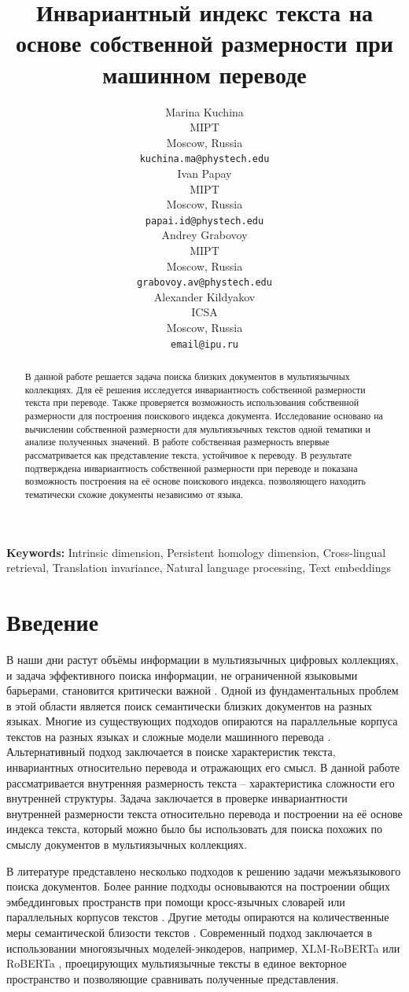 \documentclass{article}
\title{Инвариантный индекс текста на основе собственной размерности при машинном переводе}
\author{
  Marina Kuchina\\
  MIPT\\
  Moscow, Russia\\
  \texttt{kuchina.ma@phystech.edu}\\
  \And
  Ivan Papay\\
  MIPT\\
  Moscow, Russia\\
  \texttt{papai.id@phystech.edu}\\
  \AND
  Andrey Grabovoy\\
  MIPT\\
  Moscow, Russia\\
  \texttt{grabovoy.av@phystech.edu}\\
  \And
  Alexander Kildyakov\\
  ICSA\\
  Moscow, Russia\\
  \texttt{email@ipu.ru}\\
}
\begin{document}
\maketitle

\begin{abstract}
  В данной работе решается задача поиска близких документов в мультиязычных коллекциях. Для её решения исследуется инвариантность собственной размерности текста при переводе. Также проверяется возможность использования собственной размерности для построения поискового индекса документа. Исследование основано на вычислении собственной размерности для мультиязычных текстов одной тематики и анализе полученных значений. В работе собственная размерность впервые рассматривается как представление текста, устойчивое к переводу. В результате подтверждена инвариантность собственной размерности при переводе и показана возможность построения на её основе поискового индекса, позволяющего находить тематически схожие документы независимо от языка.
\end{abstract}

\textbf{Keywords:} Intrinsic dimension, Persistent homology dimension, Cross-lingual retrieval, Translation invariance, Natural language processing, Text embeddings

\section{Введение}\label{sec:intro}

В наши дни растут объёмы информации в мультиязычных цифровых коллекциях, и задача эффективного поиска информации, не ограниченной языковыми барьерами, становится критически важной \cite{bakhteev2019crosslang}. Одной из фундаментальных проблем в этой области является поиск семантически близких \cite{panchenko2018russeworkshoprussiansemantic} документов на разных языках. Многие из существующих подходов опираются на параллельные корпуса текстов на разных языках и сложные модели машинного перевода \cite{Avetisyan2023}. Альтернативный подход заключается в поиске характеристик текста, инвариантных относительно перевода и отражающих его смысл. В данной работе рассматривается внутренняя размерность текста – характеристика сложности его внутренней структуры. Задача заключается в проверке инвариантности внутренней размерности текста относительно перевода и построении на её основе индекса текста, который можно было бы использовать для поиска похожих по смыслу документов в мультиязычных коллекциях.

В литературе представлено несколько подходов к решению задачи межъязыкового поиска документов. Более ранние подходы основываются на построении общих эмбеддинговых пространств при помощи кросс-язычных словарей или параллельных корпусов текстов \cite{Vulic2015-ve}. Другие методы опираются на количественные меры семантической близости текстов \cite{article}. Современный подход заключается в использовании многоязычных моделей-энкодеров, например, XLM-RoBERTa \cite{conneau2020unsupervisedcrosslingualrepresentationlearning} или RoBERTa \cite{liu2019robertarobustlyoptimizedbert}, проецирующих мультиязычные тексты в единое векторное пространство и позволяющие сравнивать полученные представления.
\end{document}
